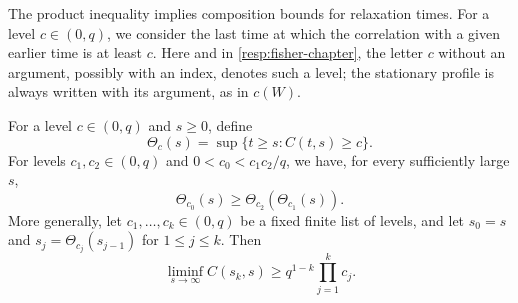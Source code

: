 The product inequality implies composition bounds for relaxation times. For a level $c\in(0,q)$, we consider the last time at which the correlation with a given earlier time is at least $c$. Here and in \cref{resp:fisher-chapter}, the letter $c$ without an argument, possibly with an index, denotes such a level; the stationary profile is always written with its argument, as in $c(W)$.

\begin{corollary}
\label{cor:geometry-last-crossing}
For a level $c\in(0,q)$ and $s\ge0$, define
\[
 \Theta_c(s)=\sup\{t\ge s:C(t,s)\ge c\}.
\]
For levels $c_1,c_2\in(0,q)$ and $0<c_0<c_1c_2/q$, we have, for every sufficiently large $s$,
\begin{equation}
 \Theta_{c_0}(s)\ge\Theta_{c_2}(\Theta_{c_1}(s)).
 \label{eq:geometry-last-crossing}
\end{equation}
More generally, let $c_1,\dots,c_k\in(0,q)$ be a fixed finite list of levels, and let $s_0=s$ and $s_j=\Theta_{c_j}(s_{j-1})$ for $1\le j\le k$. Then
\[
 \liminf_{s\to\infty}C(s_k,s)\ge q^{1-k}\prod_{j=1}^kc_j .
\]
\end{corollary}

